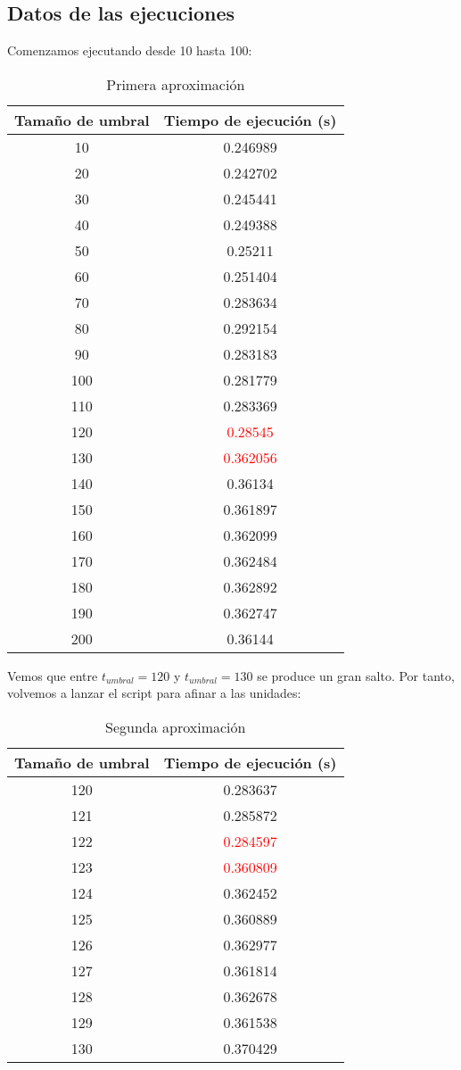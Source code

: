 \documentclass[12pt,spanish]{article}
\begin{document}
\subsection{Datos de las ejecuciones}
Comenzamos ejecutando desde 10 hasta 100:
\begin{table}[H]
\centering
\begin{tabular}{|c|c|}
\hline
\textbf{Tamaño de umbral} & \textbf{Tiempo de ejecución (s)}\\
\hline
10 & 0.246989\\
\hline
20 & 0.242702\\
\hline
30 & 0.245441\\
\hline
40 & 0.249388\\
\hline
50 & 0.25211\\
\hline
60 & 0.251404\\
\hline
70 & 0.283634\\
\hline
80 & 0.292154\\
\hline
90 & 0.283183\\
\hline
100 & 0.281779\\
\hline
110 & 0.283369\\
\hline
120 & \textcolor{red}{0.28545}\\
\hline
130 & \textcolor{red}{0.362056}\\
\hline
140 & 0.36134\\
\hline
150 & 0.361897\\
\hline
160 & 0.362099\\
\hline
170 & 0.362484\\
\hline
180 & 0.362892\\
\hline
190 & 0.362747\\
\hline
200 & 0.36144\\
\hline
\end{tabular}
\caption{Primera aproximación}
\end{table}
Vemos que entre $t_{umbral}=120$ y $t_{umbral}=130$ se produce un gran salto. Por tanto, volvemos a lanzar el script para afinar a las unidades:
\begin{table}[H]
\centering
\begin{tabular}{|c|c|}
\hline
\textbf{Tamaño de umbral} & \textbf{Tiempo de ejecución (s)}\\
\hline
120 & 0.283637\\
\hline
121 & 0.285872\\
\hline
122 & \textcolor{red}{0.284597}\\
\hline
123 & \textcolor{red}{0.360809}\\
\hline
124 & 0.362452\\
\hline
125 & 0.360889\\
\hline
126 & 0.362977\\
\hline
127 & 0.361814\\
\hline
128 & 0.362678\\
\hline
129 & 0.361538\\
\hline
130 & 0.370429\\
\hline
\end{tabular}
\caption{Segunda aproximación}
\end{table}
\end{document}
